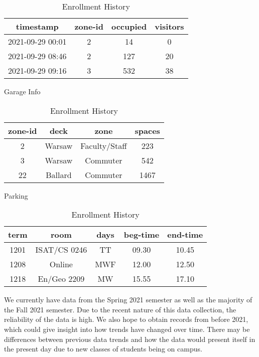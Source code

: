 \documentclass[11pt]{article}
\begin{document}
\begin{table}[ht!]
    \centering
    \begin{tabular}{|c c c c|} 
        \hline
        timestamp & zone-id & occupied & visitors \\ [0.5ex] 
        \hline\hline
        2021-09-29 00:01 & 2 & 14 & 0 \\ 
        \hline
        2021-09-29 08:46 & 2 & 127 & 20 \\
        \hline
        2021-09-29 09:16 & 3 & 532 & 38 \\
        \hline
    \end{tabular}
    \caption{Garage Info}
    
    \vskip 0.1in
    
    \begin{tabular}{|c c c c|} 
        \hline
        zone-id & deck & zone & spaces \\ [0.5ex] 
        \hline\hline
        2 & Warsaw & Faculty/Staff & 223 \\ 
        \hline
        3 & Warsaw & Commuter & 542 \\
        \hline
        22 & Ballard & Commuter & 1467 \\
        \hline
        \end{tabular}
        \caption{Parking}
        
    \vskip 0.1in
        
    \begin{tabular}{|c c c c c|} 
        \hline
        term & room & days & beg-time & end-time \\ [0.5ex] 
        \hline\hline
        1201 & ISAT/CS 0246 & TT & 09.30 & 10.45 \\ 
        \hline
        1208 & Online & MWF & 12.00 & 12.50 \\
        \hline
        1218 & En/Geo 2209 & MW & 15.55 & 17.10 \\
        \hline
        \end{tabular}
        \caption{Enrollment History}
\end{table}

We currently have data from the Spring 2021 semester as well as the majority of the Fall 2021 semester. Due to the recent nature of this data collection, the reliability of the data is high. We also hope to obtain records from before 2021, which could give insight into how trends have changed over time. There may be differences between previous data trends and how the data would present itself in the present day due to new classes of students being on campus.
\end{document}
